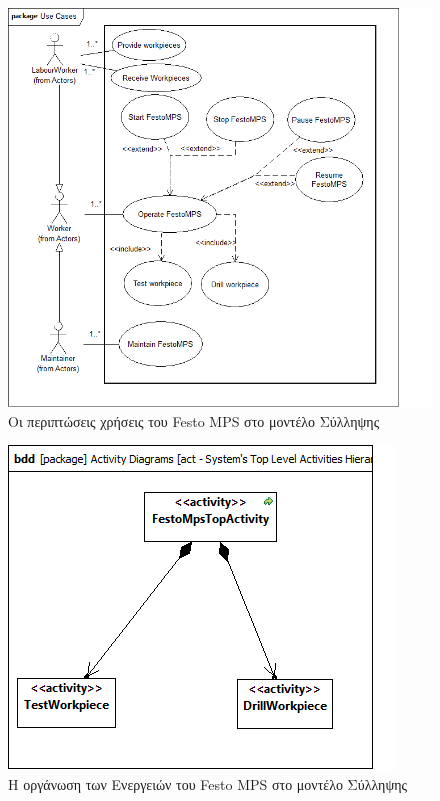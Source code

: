 \documentclass[a4paper,12pt,twoside]{report}
\begin{document}
\begin{appendices}
\begin{figure}[hp]
					\centering
					\includegraphics[scale=0.60]{ConceptionalModel_uc-SystemsTopLevelUseCases.png}
					\caption{Οι περιπτώσεις χρήσεις του Festo MPS στο μοντέλο Σύλληψης}
					\label{φωτ:Οι περιπτώσεις χρήσεις του Festo MPS στο μοντέλο Σύλληψης}
				\end{figure}
				\begin{figure}[hp]
					\centering
					\includegraphics[scale=0.45]{ConceptionalModel_act-SystemsTopLevelActivitiesHierarchy.png}
					\caption{Η οργάνωση των Ενεργειών του Festo MPS στο μοντέλο Σύλληψης}
					\label{φωτ:Η οργάνωση των Ενεργειών του Festo MPS στο μοντέλο Σύλληψης}
				\end{figure}

\end{appendices}
\end{document}
